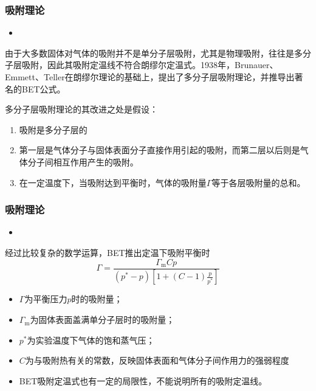 \begin{frame}
    \frametitle{吸附理论}

    \begin{itemize}
        \item[3.] 
    \end{itemize}
    由于大多数固体对气体的吸附并不是单分子层吸附，尤其是物理吸附，往往是多分子层吸附，因此其吸附定温线不符合朗缪尔定温式。1938年，Brunauer、Emmett、Teller在朗缪尔理论的基础上，提出了多分子层吸附理论，并推导出著名的BET公式。

    多分子层吸附理论的其改进之处是假设：
    \begin{enumerate}
        \item 吸附是多分子层的
        \item 第一层是气体分子与固体表面分子直接作用引起的吸附，而第二层以后则是气体分子间相互作用产生的吸附。
        \item 在一定温度下，当吸附达到平衡时，气体的吸附量$\varGamma$等于各层吸附量的总和。
    \end{enumerate}

\end{frame}


\begin{frame}
    \frametitle{吸附理论}

    \begin{itemize}
        \item[3.] 
    \end{itemize}
    经过比较复杂的数学运算，BET推出定温下吸附平衡时
    \[
        \varGamma=\frac{\varGamma_{\mathrm{m}} C p}{(p^{*}-p)\left[1+(C-1) \frac{p}{p^{*}}\right]}
    \]
    \begin{itemize}
        \item $\varGamma$为平衡压力$p$时的吸附量；
        \item $\varGamma_{\mathrm{m}}$为固体表面盖满单分子层时的吸附量；
        \item $p^*$为实验温度下气体的饱和蒸气压；
        \item $C$为与吸附热有关的常数，反映固体表面和气体分子间作用力的强弱程度
        \item BET吸附定温式也有一定的局限性，不能说明所有的吸附定温线。
    \end{itemize}

\end{frame}


